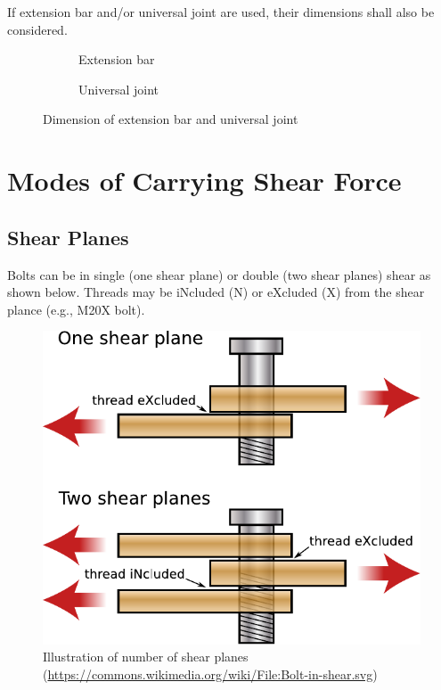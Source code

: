 If extension bar and/or universal joint are used, their dimensions shall also be considered.
\begin{figure}[H]
\centering
\begin{subfigure}{.49\linewidth}\centering

\caption{Extension bar}
\end{subfigure}\hfill
\begin{subfigure}{.49\linewidth}\centering

\caption{Universal joint}
\end{subfigure}
\caption{Dimension of extension bar and universal joint \citet{ASI2016}}
\end{figure}
\section{Modes of Carrying Shear Force}
\subsection{Shear Planes}
Bolts can be in single (one shear plane) or double (two shear planes) shear as shown below. Threads may be iNcluded (N) or eXcluded (X) from the shear plance (e.g., M20X bolt).
\begin{figure}[H]
\centering
\includegraphics{PIC/CH06/SP}
\caption{Illustration of number of shear planes (\href{https://commons.wikimedia.org/wiki/File:Bolt-in-shear.svg}{\url{https://commons.wikimedia.org/wiki/File:Bolt-in-shear.svg}})}
\end{figure}
